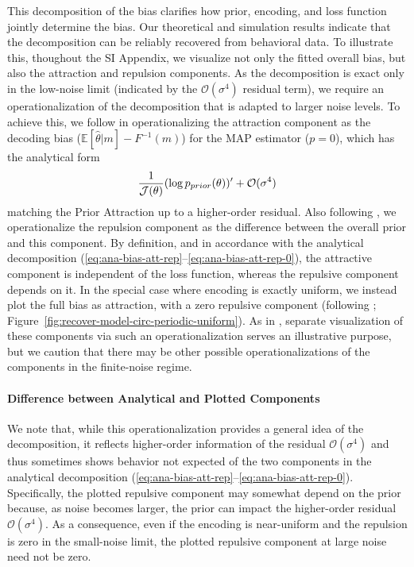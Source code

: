 \documentclass[si.tex]{subfiles}
\begin{document}
This decomposition of the bias clarifies how prior, encoding, and loss function jointly determine the bias.
Our theoretical and simulation results indicate that the decomposition can be reliably recovered from behavioral data.
To illustrate this, thoughout the SI Appendix, we visualize not only the fitted overall bias, but also the attraction and repulsion components.
As the decomposition is exact only in the low-noise limit (indicated by the $\mathcal{O}(\sigma^4)$ residual term), we require an operationalization of the decomposition that is adapted to larger noise levels.
To achieve this, we follow \cite{hahn2024unifying} in operationalizing the attraction component as the decoding bias ($\mathbb{E}[\mathbb{\widehat{\theta}}|m] - F^{-1}(m)$) for the MAP estimator ($p=0$), which has the analytical form
\begin{equation}
    \frac{1}{\mathcal{J}(\theta)} (\log p_{prior}(\theta))' + \mathcal{O}(\sigma^4)
\end{equation}
matching the Prior Attraction up to a higher-order residual.
Also following \cite{hahn2024unifying}, we operationalize the repulsion component as the difference between the overall prior and this component.
By definition, and in accordance with the analytical decomposition (\ref{eq:ana-bias-att-rep}--\ref{eq:ana-bias-att-rep-0}), the attractive component is independent of the loss function, whereas the repulsive component depends on it.
In the special case where encoding is exactly uniform, we instead plot the full bias as attraction, with a zero repulsive component (following \cite{hahn2024unifying}; Figure~\ref{fig:recover-model-circ-periodic-uniform}).
As in \cite{hahn2024unifying}, separate visualization of these components via such an operationalization serves an illustrative purpose, but we caution that there may be other possible operationalizations of the components in the finite-noise regime.

\paragraph*{Difference between Analytical and Plotted Components}
We note that, while this operationalization provides a general idea of the decomposition, it reflects higher-order information of the residual $\mathcal{O}(\sigma^4)$ and thus sometimes shows behavior not expected of the two components in the analytical decomposition (\ref{eq:ana-bias-att-rep}--\ref{eq:ana-bias-att-rep-0}). Specifically, the plotted repulsive component may somewhat depend on the prior because, as noise becomes larger, the prior can impact the higher-order residual $\mathcal{O}(\sigma^4)$. As a consequence, even if the encoding is near-uniform and the repulsion is zero in the small-noise limit, the plotted repulsive component at large noise need not be zero.
\end{document}
